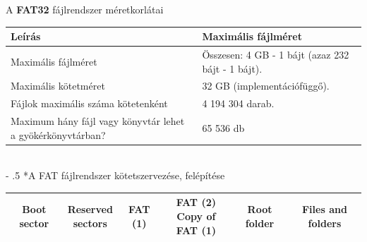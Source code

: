 \documentclass[tikz,12pt,margin=0px]{article}
\makeatletter
\renewcommand\paragraph{%
	\@startsection{paragraph}{4}{0mm}%
	{-\baselineskip}%
	{.5\baselineskip}%
	{\normalfont\normalsize\bfseries}}
\makeatother
\begin{document}
    \noindent A \textbf{FAT32} fájlrendszer méretkorlátai\\

    \noindent \renewcommand{\arraystretch}{2}
    {\footnotesize
      \begin{tabular}{|p{6cm}|p{9cm}|} \hline
      Leírás & Maximális fájlméret \\ \hline \hline
      Maximális fájlméret & Összesen: 4 GB - 1 bájt (azaz 232 bájt - 1 bájt). \\ \hline
      Maximális kötetméret & 32 GB (implementációfüggő). \\ \hline
      Fájlok maximális száma kötetenként & 4 194 304 darab. \\ \hline
      Maximum hány fájl vagy könyvtár lehet a gyökérkönyvtárban? & 65 536 db \\ \hline
      \end{tabular}
    }
    \renewcommand{\arraystretch}{1}\\

    \paragraph*{A FAT fájlrendszer kötetszervezése, felépítése}

        {\footnotesize
    \begin{centering}
        \noindent \renewcommand{\arraystretch}{2}
            \begin{tabular}{|c|c|c|c|c|c|} \hline
                \textbf{Boot sector} & \makecell{Reserved \\ sectors} & \textbf{FAT} (1) & \makecell{\textbf{FAT (2)}\\Copy of FAT (1)} & \textbf{Root folder} & \textbf{Files and folders} \\ \hline
            \end{tabular}
        \renewcommand{\arraystretch}{1}\\
    \end{centering}
        }
\end{document}
